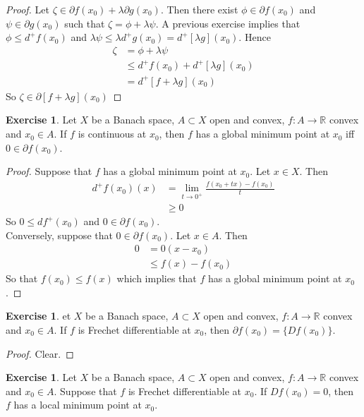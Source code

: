 \documentclass[12pt]{amsart}
\theoremstyle{definition}
\newtheorem{ex}[definition]{Exercise}
\newcommand{\lam}{\lambda}
\newcommand{\R}{\mathbb{R}}
\newcommand{\p}{\partial}
\newcommand{\lex}[1]{\label{ex:#1}}
\begin{document}
	\begin{proof}
	Let $\zeta \in \p f(x_0) + \lam \p g(x_0)$. Then there exist $\phi \in \p f(x_0)$ and $\psi \in \p g(x_0)$ such that $\zeta = \phi + \lam \psi$. A previous exercise implies that $\phi \leq d^+f(x_0)$ and $\lam \psi \leq \lam d^+g(x_0) = d^+[\lam g](x_0)$. Hence 
	\begin{align*}
	\zeta
	&= \phi + \lam \psi \\
	&\leq d^+f(x_0) + d^+[\lam g](x_0) \\
	&= d^+[f + \lam g](x_0)
	\end{align*}
	So $\zeta \in \p [f+\lam g](x_0)$
	\end{proof}
	
	\begin{ex} \lex{}
	Let $X$ be a Banach space, $A \subset X$ open and convex, $f:A \rightarrow \R$ convex and $x_0 \in A$. If $f$ is continuous at $x_0$, then $f$ has a global minimum point at $x_0$ iff $0 \in \p f(x_0)$.
	\end{ex}
	
	\begin{proof}
	Suppose that $f$ has a global minimum point at $x_0$. Let $x \in X$. Then 
	\begin{align*}
	d^+f(x_0)(x) 
	&= \lim_{t \rightarrow 0^+} \frac{f(x_0 + tx) - f(x_0)}{t} \\
	& \geq 0
	\end{align*}
	So $0 \leq df^+(x_0)$ and $0 \in \p f(x_0)$.\\
	Conversely, suppose that $0 \in \p f(x_0)$. Let $x \in A$. Then 
	\begin{align*}
	0
	& = 0(x - x_0) \\
	& \leq f(x) - f(x_0)
	\end{align*}
	So that $f(x_0) \leq f(x)$ which implies that $f$ has a global minimum point at $x_0$.
	\end{proof}
	
	\begin{ex}
	et $X$ be a Banach space, $A \subset X$ open and convex, $f:A \rightarrow \R$ convex and $x_0 \in A$. If $f$ is Frechet differentiable at $x_0$, then $\p f(x_0) = \{Df(x_0)\}$. 
	\end{ex}	
	
	\begin{proof}
	Clear.
	\end{proof}
	
	\begin{ex}
	Let $X$ be a Banach space, $A \subset X$ open and convex, $f:A \rightarrow \R$ convex and $x_0 \in A$. Suppose that $f$ is Frechet differentiable at $x_0$. If $Df(x_0) = 0$, then $f$ has a local minimum point at $x_0$. 
	\end{ex}
	
\end{document}
